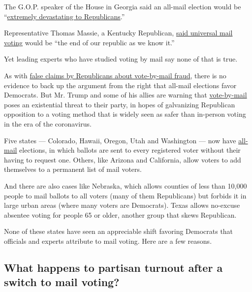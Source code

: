 The G.O.P. speaker of the House in Georgia said an all-mail election
would be
``\href{https://www.ajc.com/news/state—regional-govt—politics/pressure-mounts-for-further-delay-georgia-may-primary-election/K1wboFdcY1z7xYt7pa11MO/}{extremely
devastating to Republicans}.''

Representative Thomas Massie, a Kentucky Republican,
\href{https://twitter.com/repthomasmassie/status/1242573156776378371}{said
universal mail voting} would be ``the end of our republic as we know
it.''

Yet leading experts who have studied voting by mail say none of that is
true.

As with
\href{https://www.nytimes3xbfgragh.onion/article/mail-in-voting-explained.html}{false
claims by Republicans about vote-by-mail fraud}, there is no evidence to
back up the argument from the right that all-mail elections favor
Democrats. But Mr. Trump and some of his allies are warning that
\href{https://www.nytimes3xbfgragh.onion/2020/06/19/us/politics/nyc-vote-by-mail.html}{vote-by-mail}
poses an existential threat to their party, in hopes of galvanizing
Republican opposition to a voting method that is widely seen as safer
than in-person voting in the era of the coronavirus.

Five states --- Colorado, Hawaii, Oregon, Utah and Washington --- now
have
\href{https://www.ncsl.org/research/elections-and-campaigns/all-mail-elections.aspx}{all-mail}
elections, in which ballots are sent to every registered voter without
their having to request one. Others, like Arizona and California, allow
voters to add themselves to a permanent list of mail voters.

And there are also cases like Nebraska, which allows counties of less
than 10,000 people to mail ballots to all voters (many of them
Republicans) but forbids it in large urban areas (where many voters are
Democrats). Texas allows no-excuse absentee voting for people 65 or
older, another group that skews Republican.

None of these states have seen an appreciable shift favoring Democrats
that officials and experts attribute to mail voting. Here are a few
reasons.

\hypertarget{what-happens-to-partisan-turnout-after-a-switch-to-mail-voting}{%
\subsection{What happens to partisan turnout after a switch to mail
voting?}\label{what-happens-to-partisan-turnout-after-a-switch-to-mail-voting}}

